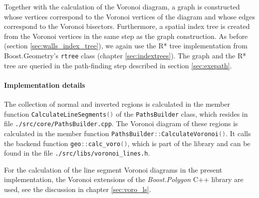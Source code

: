 Together with the calculation of the Voronoi diagram, a graph is constructed whose
vertices correspond to the Voronoi vertices of the diagram and whose edges correspond
to the Voronoi bisectors. 
Furthermore, a spatial index tree is created from the Voronoi vertices in the same 
step as the graph construction.
As before (section \ref{sec:walls_index_tree}), we again use the R* tree implementation
from Boost.Geometry's \cite{web_boost_geometry} \lstinline[language=C++]|rtree| 
class \cite{web_boost_geometry_rtree} (chapter \ref{sec:indextrees}).
The graph and the R* tree are queried in the path-finding step described in
section \ref{sec:exepath}.

\paragraph{Implementation details}
The collection of normal and inverted regions is calculated in the member function
\lstinline[language=C++]|CalculateLineSegments()| of the \lstinline[language=C++]|PathsBuilder|
class, which resides in file \lstinline|./src/core/PathsBuilder.cpp|. 
The Voronoi diagram of these regions is calculated in the member function
\lstinline[language=C++]|PathsBuilder::CalculateVoronoi()|.
It calls the backend function \lstinline[language=C++]|geo::calc_voro()|, which is part
of the library and can be found in the file \lstinline|./src/libs/voronoi_lines.h|.

For the calculation of the line segment Voronoi diagrams in the present implementation, 
the Voronoi extensions \cite{web_boost_polygon_voronoi} of the \textit{Boost.Polygon} 
\cite{web_boost_polygon, Simonson2009} C++ library are used, see the discussion in 
chapter \ref{sec:voro_ls}.


